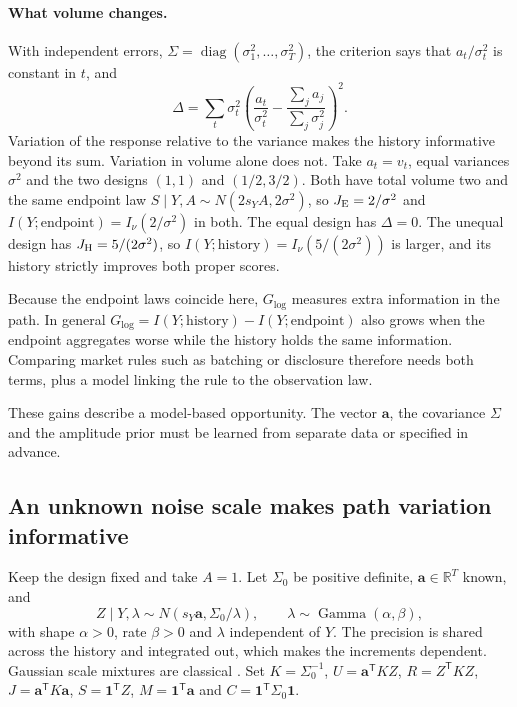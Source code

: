 \documentclass[runningheads]{llncs}
\newcommand{\R}{\mathbb R}
\begin{document}
\paragraph{What volume changes.}
With independent errors, $\Sigma=\operatorname{diag}(\sigma_1^2,\ldots,\sigma_T^2)$, the criterion says that $a_t/\sigma_t^2$ is constant in $t$, and
\begin{equation}
 \Delta=\sum_t\sigma_t^2\left(\frac{a_t}{\sigma_t^2}-\frac{\sum_ja_j}{\sum_j\sigma_j^2}\right)^2.
 \label{eq:ext-volume-dispersion}
\end{equation}
Variation of the response relative to the variance makes the history informative beyond its sum. Variation in volume alone does not. Take $a_t=v_t$, equal variances $\sigma^2$ and the two designs $(1,1)$ and $(1/2,3/2)$. Both have total volume two and the same endpoint law $S\mid Y,A\sim N(2s_YA,2\sigma^2)$, so $J_{\rm E}=2/\sigma^2$ and $I(Y;\text{endpoint})=I_\nu(2/\sigma^2)$ in both. The equal design has $\Delta=0$. The unequal design has $J_{\rm H}=5/(2\sigma^2)$, so $I(Y;\text{history})=I_\nu(5/(2\sigma^2))$ is larger, and its history strictly improves both proper scores.

Because the endpoint laws coincide here, $G_{\log}$ measures extra information in the path. In general $G_{\log}=I(Y;\text{history})-I(Y;\text{endpoint})$ also grows when the endpoint aggregates worse while the history holds the same information. Comparing market rules such as batching or disclosure therefore needs both terms, plus a model linking the rule to the observation law.

These gains describe a model-based opportunity. The vector $\boldsymbol a$, the covariance $\Sigma$ and the amplitude prior must be learned from separate data or specified in advance.

\subsection{An unknown noise scale makes path variation informative}
\label{sec:scale}
Keep the design fixed and take $A=1$. Let $\Sigma_0$ be positive definite, $\boldsymbol a\in\R^T$ known, and
\begin{equation}
 Z\mid Y,\lambda\sim N(s_Y\boldsymbol a,\Sigma_0/\lambda),\qquad\lambda\sim\operatorname{Gamma}(\alpha,\beta),
 \label{eq:scale-model}
\end{equation}
with shape $\alpha>0$, rate $\beta>0$ and $\lambda$ independent of $Y$. The precision is shared across the history and integrated out, which makes the increments dependent. Gaussian scale mixtures are classical \cite{lange1989robust}. Set $K=\Sigma_0^{-1}$, $U=\boldsymbol a^{\mathsf T}KZ$, $R=Z^{\mathsf T}KZ$, $J=\boldsymbol a^{\mathsf T}K\boldsymbol a$, $S=\boldsymbol1^{\mathsf T}Z$, $M=\boldsymbol1^{\mathsf T}\boldsymbol a$ and $C=\boldsymbol1^{\mathsf T}\Sigma_0\boldsymbol1$.
\end{document}
